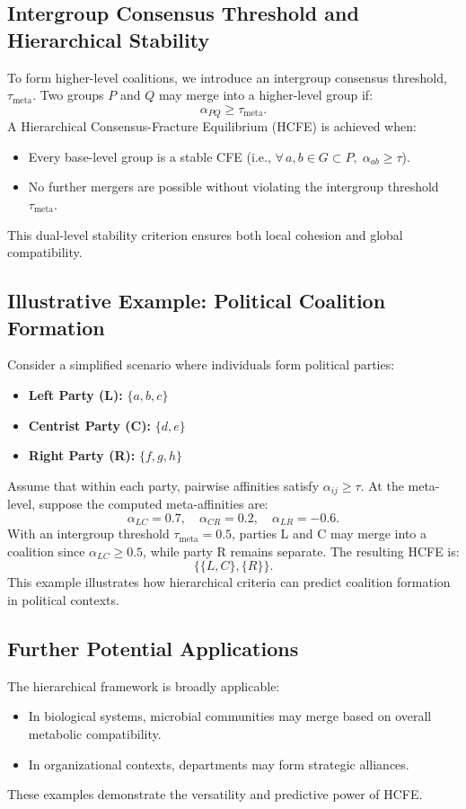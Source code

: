 \documentclass{article}
\begin{document}
\subsection{Intergroup Consensus Threshold and Hierarchical Stability}
To form higher-level coalitions, we introduce an intergroup consensus threshold, $\tau_{\text{meta}}$. Two groups $P$ and $Q$ may merge into a higher-level group if:
\[
\alpha_{PQ} \ge \tau_{\text{meta}}.
\]
A Hierarchical Consensus-Fracture Equilibrium (HCFE) is achieved when:
\begin{itemize}
  \item Every base-level group is a stable CFE (i.e., $\forall\, a,b \in G \subset P,\; \alpha_{ab} \ge \tau$).
  \item No further mergers are possible without violating the intergroup threshold $\tau_{\text{meta}}$.
\end{itemize}
This dual-level stability criterion ensures both local cohesion and global compatibility.

\subsection{Illustrative Example: Political Coalition Formation}
Consider a simplified scenario where individuals form political parties:
\begin{itemize}
  \item \textbf{Left Party (L):} $\{a,b,c\}$
  \item \textbf{Centrist Party (C):} $\{d,e\}$
  \item \textbf{Right Party (R):} $\{f,g,h\}$
\end{itemize}
Assume that within each party, pairwise affinities satisfy $\alpha_{ij}\ge \tau$. At the meta-level, suppose the computed meta-affinities are:
\[
\alpha_{LC}=0.7,\quad \alpha_{CR}=0.2,\quad \alpha_{LR}=-0.6.
\]
With an intergroup threshold $\tau_{\text{meta}}=0.5$, parties L and C may merge into a coalition since $\alpha_{LC}\ge 0.5$, while party R remains separate. The resulting HCFE is:
\[
\{\{L, C\}, \{R\}\}.
\]
This example illustrates how hierarchical criteria can predict coalition formation in political contexts.

\subsection{Further Potential Applications}
The hierarchical framework is broadly applicable:
\begin{itemize}
  \item In biological systems, microbial communities may merge based on overall metabolic compatibility.
  \item In organizational contexts, departments may form strategic alliances.
\end{itemize}
These examples demonstrate the versatility and predictive power of HCFE.
\end{document}
